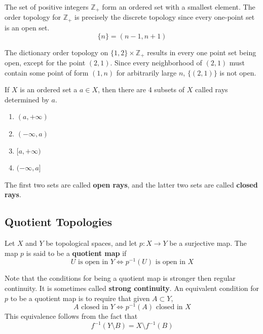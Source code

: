 \documentclass{article}
\begin{document}
    \begin{example}
      The set of positive integers $\mathbb{Z}_+$ form an ordered set with a smallest element. The order topology for $\mathbb{Z}_+$ is precisely the discrete topology since every one-point set is an open set. 
      \[\{n\} = (n-1, n+1)\]
    \end{example}

    \begin{example}
      The dictionary order topology on $\{1, 2\} \times \mathbb{Z}_+$ results in every one point set being open, except for the point $(2, 1)$. Since every neighborhood of $(2,1)$ must contain some point of form $(1, n)$ for arbitrarily large $n$, $\{(2,1)\}$ is not open. 
    \end{example}

    \begin{definition}
      If $X$ is an ordered set a $a \in X$, then there are 4 subsets of $X$ called rays determined by $a$. 
      \begin{enumerate}
        \item $(a, +\infty)$ 
        \item $(-\infty, a)$
        \item $[a, +\infty)$
        \item $(-\infty, a]$
      \end{enumerate}
      The first two sets are called \textbf{open rays}, and the latter two sets are called \textbf{closed rays}. 
    \end{definition}

  \subsection{Quotient Topologies}

    \begin{definition}
    Let $X$ and $Y$ be topological spaces, and let $p: X \longrightarrow Y$ be a surjective map. The map $p$ is said to be a \textbf{quotient map} if
    \[U \text{ is open in } Y \iff p^{-1}(U) \text{ is open in } X\]
    \end{definition}

    Note that the conditions for being a quotient map is stronger then regular continuity. It is sometimes called \textbf{strong continuity}. An equivalent condition for $p$ to be a quotient map is to require that given $A \subset Y$, 
    \[A \text{ closed in } Y \iff p^{-1}(A) \text{ closed in } X\]
    This equivalence follows from the fact that
    \[f^{-1}(Y \setminus B) = X \setminus f^{-1}(B)\]
\end{document}
